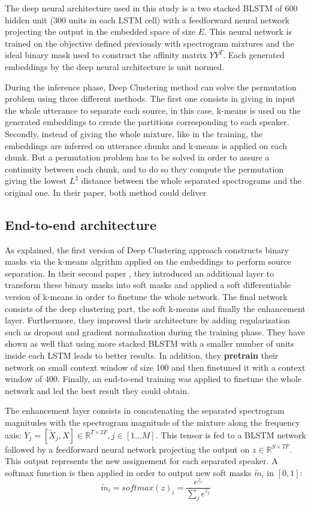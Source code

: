 \documentclass[master, tikz, final,11pt, dvipdfmx]{iscs-thesis}
\begin{document}
The deep neural architecture used in this study is a two stacked BLSTM of 600 hidden unit (300 units in each LSTM cell) with a feedforward neural network projecting the output in the embedded space of size $E$. This neural network is trained on the objective defined previously with spectrogram mixtures and the ideal binary mask used to construct the affinity matrix $YY^T$. Each generated embeddings by the deep neural architecture is unit normed.

During the inference phase, Deep Clustering method can solve the permutation problem using three different methods. The first one consists in giving in input the whole utterance to separate each source, in this case, k-means is used on the generated embeddings to create the partitions corresponding to each speaker. Secondly, instead of giving the whole mixture, like in the training, the embeddings are inferred on utterance chunks and k-means is applied on each chunk. But a permutation problem has to be solved in order to assure a continuity between each chunk, and to do so they compute the permutation giving the lowest $L^2$ distance between the whole separated spectrograms and the original one. In their paper, both method could deliver 
\subsection{End-to-end architecture}
\label{EEA}

As explained, the first version of Deep Clustering \cite{DPCLV1} approach constructs binary masks via the k-means algrithm applied on the embeddings to perform source separation. In their second paper \cite{DPCLV2}, they introduced an additional layer to transform these binary masks into soft masks and applied a soft differentiable version of k-means in order to finetune the whole network. The final network consists of the deep clustering part, the soft k-means and finally the enhancement layer.
Furthermore, they improved their architecture by adding regularization such as dropout and gradient normalization during the training phase. They have shown as well that using more stacked BLSTM with a smaller number of units inside each LSTM leads to better results.
In addition, they \textbf{pretrain} their network on small context window of size 100 and then finetuned it with a context window of 400. Finally, an end-to-end training was applied to finetune the whole network and led the best result they could obtain.

The enhancement layer consists in concatenating the separated spectrogram magnitudes with the spectrogram magnitude of the mixture along the frequency axis: $Y_j = [\tilde X_j, X] \in \mathbb{R}^{T\times 2F}, j \in [1\dots M]$.
 This tensor is fed to a BLSTM network followed by a feedforward neural network projecting the output on $z \in \mathbb{R}^{S\times TF}$. This output represents the new assignement for each separated speaker. A softmax function is then applied in order to output new soft masks $\tilde m_i$ in $[0,1]$:
\[
\tilde m_i = softmax(z)_i  = \frac{e^{z_i}}{\sum_j{e^{z_j}}} 
\]
\end{document}
